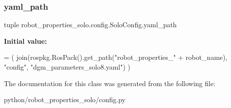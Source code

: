 \subsubsection{\texorpdfstring{yaml\+\_\+path}{yaml\_path}}
{\footnotesize\ttfamily tuple robot\+\_\+properties\+\_\+solo.\+config.\+Solo\+Config.\+yaml\+\_\+path\hspace{0.3cm}{\ttfamily [static]}}

{\bfseries Initial value\+:}
\begin{DoxyCode}
=  (
        join(rospkg.RosPack().get\_path(\textcolor{stringliteral}{"robot\_properties\_"} + robot\_name),
             \textcolor{stringliteral}{"config"},
             \textcolor{stringliteral}{"dgm\_parameters\_solo8.yaml"})
    )
\end{DoxyCode}


The documentation for this class was generated from the following file\+:\begin{DoxyCompactItemize}
\item 
python/robot\+\_\+properties\+\_\+solo/config.\+py\end{DoxyCompactItemize}
